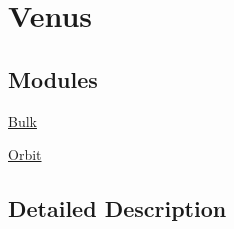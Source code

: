 \hypertarget{group___e_g_x_phys-_constants-_astrophysics-_solar_system-_venus}{}\section{Venus}
\label{group___e_g_x_phys-_constants-_astrophysics-_solar_system-_venus}
\subsection*{Modules}
\begin{DoxyCompactItemize}
\item 
\mbox{\hyperlink{group___e_g_x_phys-_constants-_astrophysics-_solar_system-_venus-_bulk}{Bulk}}
\item 
\mbox{\hyperlink{group___e_g_x_phys-_constants-_astrophysics-_solar_system-_venus-_orbit}{Orbit}}
\end{DoxyCompactItemize}


\subsection{Detailed Description}
